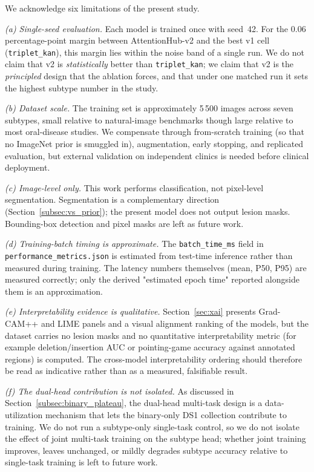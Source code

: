 We acknowledge six limitations of the present study.

\emph{(a) Single-seed evaluation.} Each model is trained once with seed~42. For
the 0.06 percentage-point margin between AttentionHub-v2 and the best v1 cell
(\texttt{triplet\_kan}), this margin lies within the noise band of a single
run. We do not claim that v2 is \emph{statistically} better than
\texttt{triplet\_kan}; we claim that v2 is the \emph{principled} design that
the ablation forces, and that under one matched run it sets the highest subtype
number in the study.

\emph{(b) Dataset scale.} The training set is approximately 5\,500 images
across seven subtypes, small relative to natural-image benchmarks though
large relative to most oral-disease studies. We compensate through from-scratch
training (so that no ImageNet prior is smuggled in), augmentation, early
stopping, and replicated evaluation, but external validation on independent
clinics is needed before clinical deployment.

\emph{(c) Image-level only.} This work performs classification, not pixel-level
segmentation. Segmentation is a complementary direction
(Section~\ref{subsec:vs_prior}); the present model does not output lesion
masks. Bounding-box detection and pixel masks are left as future work.

\emph{(d) Training-batch timing is approximate.} The \texttt{batch\_time\_ms}
field in \texttt{performance\_metrics.json} is estimated from test-time
inference rather than measured during training. The latency numbers themselves
(mean, P50, P95) are measured correctly; only the derived "estimated epoch
time" reported alongside them is an approximation.

\emph{(e) Interpretability evidence is qualitative.} Section~\ref{sec:xai}
presents Grad-CAM++ and LIME panels and a visual alignment ranking of the
models, but the dataset carries no lesion masks and no quantitative
interpretability metric (for example deletion/insertion AUC or
pointing-game accuracy against annotated regions) is computed. The
cross-model interpretability ordering should therefore be read as indicative
rather than as a measured, falsifiable result.

\emph{(f) The dual-head contribution is not isolated.} As discussed in
Section~\ref{subsec:binary_plateau}, the dual-head multi-task design is a
data-utilization mechanism that lets the binary-only DS1 collection contribute
to training. We do not run a subtype-only single-task control, so we do not
isolate the effect of joint multi-task training on the subtype head; whether
joint training improves, leaves unchanged, or mildly degrades subtype accuracy
relative to single-task training is left to future work.

